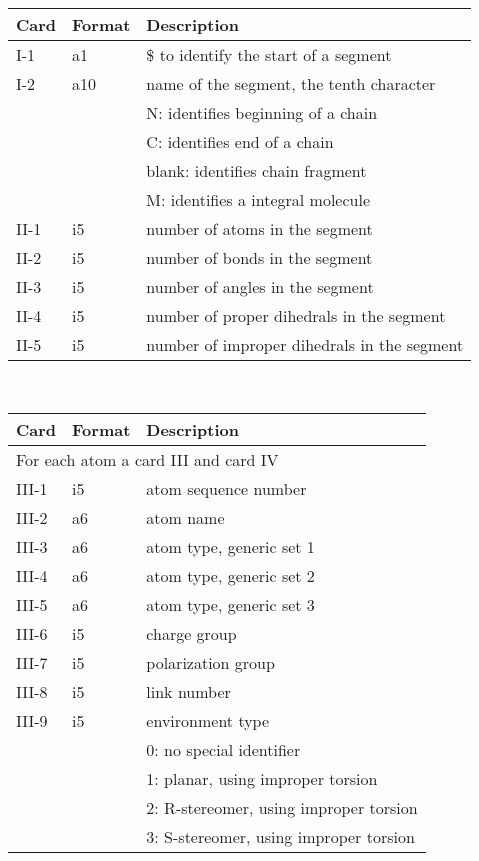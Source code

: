 \begin{center}
\begin{tabular}{lll}
\hline\hline
Card & Format & Description \\ \hline
I-1  & a1     & \$ to identify the start of a segment \\
I-2  & a10    & name of the segment, the tenth character\\
     &        & N: identifies beginning of a chain\\
     &        & C: identifies end of a chain\\
     &        & blank: identifies chain fragment\\
     &        & M: identifies a integral molecule\\
II-1 & i5     & number of atoms in the segment\\
II-2 & i5     & number of bonds in the segment\\
II-3 & i5     & number of angles in the segment\\
II-4 & i5     & number of proper dihedrals in the segment\\
II-5 & i5     & number of improper dihedrals in the segment\\
\hline
\end{tabular}\\
\begin{tabular}{lll}
\hline\hline
Card & Format & Description \\ \hline
\multicolumn{3}{l}{For each atom a card III and card IV} \\
III-1 & i5     & atom sequence number \\
III-2 & a6     & atom name \\
III-3 & a6     & atom type, generic set 1 \\
III-4 & a6     & atom type, generic set 2 \\
III-5 & a6     & atom type, generic set 3 \\
III-6 & i5     & charge group\\
III-7 & i5     & polarization group\\
III-8 & i5     & link number\\
III-9 & i5     & environment type\\
      &        & 0: no special identifier\\
      &        & 1: planar, using improper torsion\\
      &        & 2: R-stereomer, using improper torsion\\
      &        & 3: S-stereomer, using improper torsion\\

\end{tabular}
\end{center}
